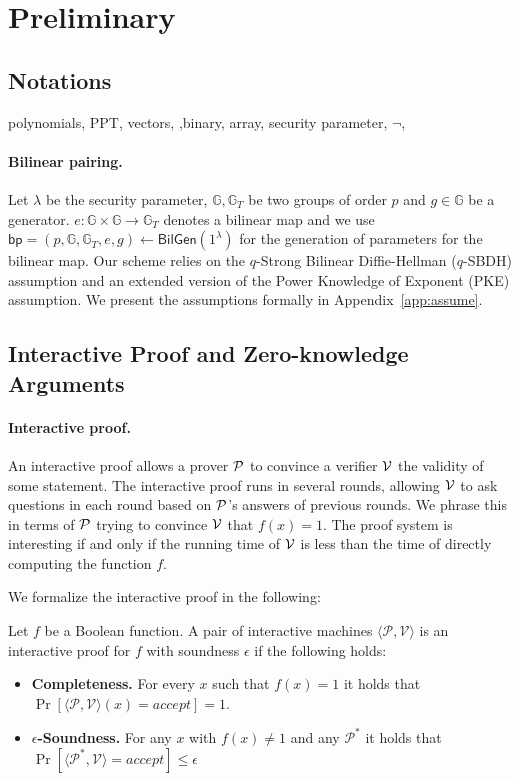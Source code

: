 \section{Preliminary}
\label{sec::prelim}

\subsection{Notations}

polynomials, PPT, vectors, ,binary, array, security parameter, $\neg$,


\paragraph{Bilinear pairing.} Let $\lambda$ be the security parameter, $\mathbb{G}, \mathbb{G}_T$ be two groups of order $p$ and $g\in\mathbb{G}$ be a generator. $e: \mathbb{G}\times\mathbb{G}\rightarrow\mathbb{G}_T$ denotes a bilinear map and we use $\mathsf{bp}=(p,\mathbb{G},\mathbb{G}_T,e,g)\leftarrow\mathsf{BilGen}(1^\lambda)$ for the generation of parameters for the bilinear map. Our scheme relies on the $q$-Strong Bilinear Diffie-Hellman ($q$-SBDH) assumption and an extended version of the Power Knowledge of Exponent (PKE) assumption. We present the assumptions formally in Appendix~\ref{app:assume}.



\subsection{Interactive Proof and Zero-knowledge Arguments}

\paragraph{Interactive proof.} An interactive proof allows a prover $\P$ to convince a verifier $\V$ the validity of some statement. The interactive proof runs in several rounds, allowing $\V$ to ask questions in each round based on $\P$'s answers of previous rounds. We phrase this in terms of $\P$ trying to convince $\V$ that $f(x)=1$. The proof system is interesting if and only if the running time of $\V$ is less than the time of directly computing the function $f$.

We formalize the interactive proof in the following:	
\begin{definition}\label{def:ip}
	Let $f$ be a Boolean function. A pair of interactive machines $\langle\mathcal{P}, \mathcal{V}\rangle$ is an interactive proof for $f$ with soundness $\epsilon$ if the following holds:
	\begin{itemize}
		\item {\bf Completeness.} For every $x$ such that $f(x) = 1$ it holds that $\Pr[\langle\mathcal{P}, \mathcal{V}\rangle(x)=accept]=1$.
		\item {\bf $\epsilon$-Soundness.} For any $x$ with $f(x) \neq 1$ and any $\mathcal{P}^*$ it holds that $\Pr[\langle\mathcal{P^*},\mathcal{V}\rangle=accept] \le \epsilon$
	\end{itemize}
\end{definition}


